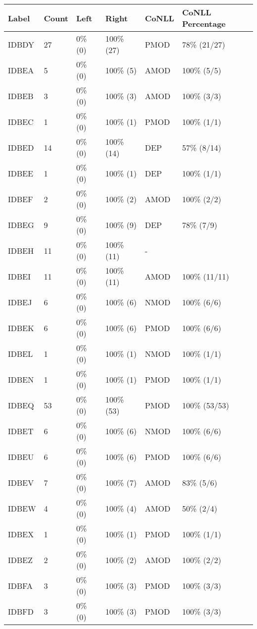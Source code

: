 \begin{figure*}
\begin{tabular}{|l|l|l|l||l|l|}
\hline
Label & Count & Left & Right & CoNLL & CoNLL Percentage\\ 
\hline
 IDBDY & 27 & 0\% (0) & 100\% (27) & PMOD & 78\% (21/27) \\ 
\hline
 IDBEA & 5 & 0\% (0) & 100\% (5) & AMOD & 100\% (5/5) \\ 
\hline
 IDBEB & 3 & 0\% (0) & 100\% (3) & AMOD & 100\% (3/3) \\ 
\hline
 IDBEC & 1 & 0\% (0) & 100\% (1) & PMOD & 100\% (1/1) \\ 
\hline
 IDBED & 14 & 0\% (0) & 100\% (14) & DEP & 57\% (8/14) \\ 
\hline
 IDBEE & 1 & 0\% (0) & 100\% (1) & DEP & 100\% (1/1) \\ 
\hline
 IDBEF & 2 & 0\% (0) & 100\% (2) & AMOD & 100\% (2/2) \\ 
\hline
 IDBEG & 9 & 0\% (0) & 100\% (9) & DEP & 78\% (7/9) \\ 
\hline
 IDBEH & 11 & 0\% (0) & 100\% (11) & - &  \\ 
\hline
 IDBEI & 11 & 0\% (0) & 100\% (11) & AMOD & 100\% (11/11) \\ 
\hline
 IDBEJ & 6 & 0\% (0) & 100\% (6) & NMOD & 100\% (6/6) \\ 
\hline
 IDBEK & 6 & 0\% (0) & 100\% (6) & PMOD & 100\% (6/6) \\ 
\hline
 IDBEL & 1 & 0\% (0) & 100\% (1) & NMOD & 100\% (1/1) \\ 
\hline
 IDBEN & 1 & 0\% (0) & 100\% (1) & PMOD & 100\% (1/1) \\ 
\hline
 IDBEQ & 53 & 0\% (0) & 100\% (53) & PMOD & 100\% (53/53) \\ 
\hline
 IDBET & 6 & 0\% (0) & 100\% (6) & NMOD & 100\% (6/6) \\ 
\hline
 IDBEU & 6 & 0\% (0) & 100\% (6) & PMOD & 100\% (6/6) \\ 
\hline
 IDBEV & 7 & 0\% (0) & 100\% (7) & AMOD & 83\% (5/6) \\ 
\hline
 IDBEW & 4 & 0\% (0) & 100\% (4) & AMOD & 50\% (2/4) \\ 
\hline
 IDBEX & 1 & 0\% (0) & 100\% (1) & PMOD & 100\% (1/1) \\ 
\hline
 IDBEZ & 2 & 0\% (0) & 100\% (2) & AMOD & 100\% (2/2) \\ 
\hline
 IDBFA & 3 & 0\% (0) & 100\% (3) & PMOD & 100\% (3/3) \\ 
\hline
 IDBFD & 3 & 0\% (0) & 100\% (3) & PMOD & 100\% (3/3) \\ 

\end{tabular}
\end{figure*}
